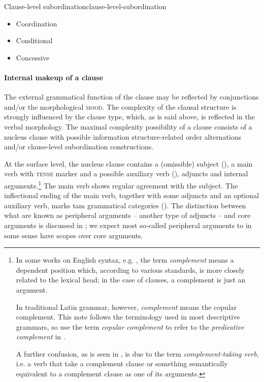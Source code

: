 \documentclass[a4paper, oneside, 12pt]{report}
\newcommand*{\term}[1]{\emph{#1}}
\newcommand*{\category}[1]{\textsc{#1}}
\begin{document}
\begin{todobox}{Clause-level subordination}{clause-level-subordination}
    \begin{itemize}
        \item Coordination
        \item Conditional
        \item Concessive
    \end{itemize}
\end{todobox}

\paragraph*{Internal makeup of a clause}\label{sec:grammatical.clause.overview.internal}
The external grammatical function of the clause
may be reflected by conjunctions and/or the morphological \category{mood}.
The complexity of the clausal structure is strongly influenced by the clause type,
which, as is said above, is reflected in the verbal morphology.
The maximal complexity possibility of a clause 
consists of a nucleus clause with possible information structure-related order alternations 
and/or clause-level subordination constructions.

At the surface level, the nucleus clause contains a (omissible) subject
(),
a main verb with \category{tense} marker and a possible auxiliary verb (),
adjuncts and internal arguments.\footnote{
    In some works on English syntax, e.g. \citet{cgel}, the term \term{complement} means a 
    dependent position which, according to various standards,
    is more closely related to the lexical head;
    in the case of clauses, a complement is just an argument.

    In traditional Latin grammar, however, \term{complement} means the copular complement. 
    This note follows the terminology used in most descriptive grammars,
    so use the term \term{copular complement} to refer to the \term{predicative complement} in \citet{cgel}.
    
    A further confusion, as is seen in , 
    is due to the term \term{complement-taking verb}, 
    i.e. a verb that take a complement clause 
    or something semantically equivalent to a complement clause
    as one of its arguments.
}
The main verb shows regular agreement with the subject.
The inflectional ending of the main verb, 
together with some adjuncts and an optional auxiliary verb,
marks \ac{tam} grammatical categories ().
The distinction between what are known as peripheral arguments
-- another type of adjuncts -- and core arguments
is discussed in ;
we expect most so-called peripheral arguments 
to in some sense have scopes over core arguments.
\end{document}

